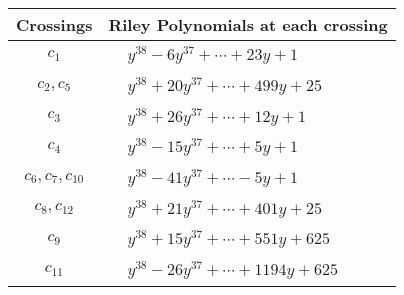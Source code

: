 \documentclass[1p]{elsarticle_modified}
\theoremstyle{definition}
\begin{document}
\begin{tabular}{m{50pt}|m{274pt}}
Crossings & \hspace{64pt}Riley Polynomials at each crossing \\
\hline $$\begin{aligned}c_{1}\end{aligned}$$&$\begin{aligned}
&y^{38}-6 y^{37}+\cdots+23 y+1
\end{aligned}$\\
\hline $$\begin{aligned}c_{2},c_{5}\end{aligned}$$&$\begin{aligned}
&y^{38}+20 y^{37}+\cdots+499 y+25
\end{aligned}$\\
\hline $$\begin{aligned}c_{3}\end{aligned}$$&$\begin{aligned}
&y^{38}+26 y^{37}+\cdots+12 y+1
\end{aligned}$\\
\hline $$\begin{aligned}c_{4}\end{aligned}$$&$\begin{aligned}
&y^{38}-15 y^{37}+\cdots+5 y+1
\end{aligned}$\\
\hline $$\begin{aligned}c_{6},c_{7},c_{10}\end{aligned}$$&$\begin{aligned}
&y^{38}-41 y^{37}+\cdots-5 y+1
\end{aligned}$\\
\hline $$\begin{aligned}c_{8},c_{12}\end{aligned}$$&$\begin{aligned}
&y^{38}+21 y^{37}+\cdots+401 y+25
\end{aligned}$\\
\hline $$\begin{aligned}c_{9}\end{aligned}$$&$\begin{aligned}
&y^{38}+15 y^{37}+\cdots+551 y+625
\end{aligned}$\\
\hline $$\begin{aligned}c_{11}\end{aligned}$$&$\begin{aligned}
&y^{38}-26 y^{37}+\cdots+1194 y+625
\end{aligned}$\\
\hline
\end{tabular}\\~\\
\end{document}
